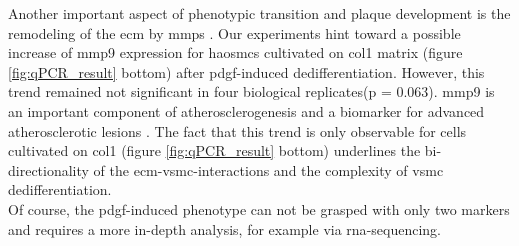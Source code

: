 Another important aspect of phenotypic transition and plaque development is the remodeling of the \ac{ecm} by \acp{mmp} \cite{johnsonMetalloproteinasesAtherosclerosis2017}.
Our experiments hint toward a possible increase of \ac{mmp9} expression for \acp{haosmc} cultivated on \ac{col1} matrix (figure \ref{fig:qPCR_result} bottom) after \ac{pdgf}-induced dedifferentiation. However, this trend remained not significant in four biological replicates(p = 0.063). \ac{mmp9} is an important component of atherosclerogenesis \cite{galisIncreasedExpressionMatrix1994} and a biomarker for advanced atherosclerotic lesions \cite{langleyExtracellularMatrixProteomics2017}. The fact that this trend is only observable for cells cultivated on \ac{col1} (figure \ref{fig:qPCR_result} bottom) underlines the bi-directionality of the \ac{ecm}-\ac{vsmc}-interactions and the complexity of \ac{vsmc} dedifferentiation.\\
Of course, the \ac{pdgf}-induced phenotype can not be grasped with only two markers and requires a more in-depth analysis, for example via \ac{rna}-sequencing.


